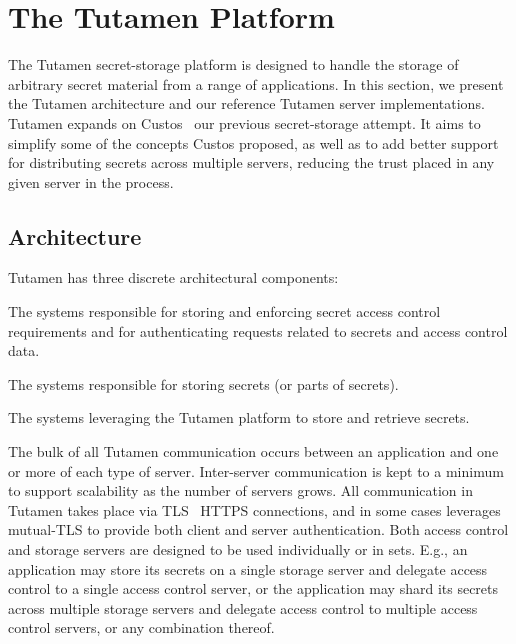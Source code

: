 \section{The Tutamen Platform}
\label{sec:tutamen}

The Tutamen secret-storage platform is designed to handle the storage
of arbitrary secret material from a range of applications.  In this
section, we present the Tutamen architecture and our reference Tutamen
server implementations. Tutamen expands on Custos~\cite{custos-trios}
our previous secret-storage attempt. It aims to simplify some of the
concepts Custos proposed, as well as to add better support for
distributing secrets across multiple servers, reducing the trust
placed in any given server in the process.

\subsection{Architecture}
\label{sec:tutamen:arch}

Tutamen has three discrete architectural components:

\begin{packed_desc}
\item[Access Control Servers (ACS):] The systems responsible for
  storing and enforcing secret access control requirements and for
  authenticating requests related to secrets and access control data.
\item[Storage Servers (SS):] The systems responsible for storing
  secrets (or parts of secrets).
\item[Applications:] The systems leveraging the Tutamen platform to
  store and retrieve secrets.
\end{packed_desc}

The bulk of all Tutamen communication occurs between an application
and one or more of each type of server. Inter-server communication is
kept to a minimum to support scalability as the number of servers
grows. All communication in Tutamen takes place via
TLS~\cite{dierks2008} HTTPS connections, and in some cases leverages
mutual-TLS to provide both client and server authentication. Both
access control and storage servers are designed to be used
individually or in sets. E.g., an application may store its secrets on
a single storage server and delegate access control to a single access
control server, or the application may shard its secrets across
multiple storage servers and delegate access control to multiple
access control servers, or any combination thereof.

